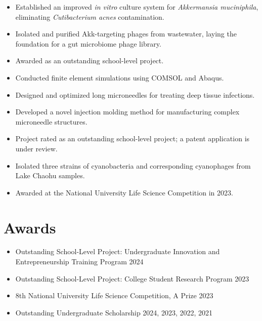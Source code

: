 \documentclass{resume}
\begin{document}
\begin{itemize}
  \item Established an improved \textit{in vitro} culture system for \textit{Akkermansia muciniphila}, eliminating \textit{Cutibacterium acnes} contamination.
  \item Isolated and purified Akk-targeting phages from wastewater, laying the foundation for a gut microbiome phage library.
  \item Awarded as an outstanding school-level project.
\end{itemize}

\begin{itemize}
  \item Conducted finite element simulations using COMSOL and Abaqus.
  \item Designed and optimized long microneedles for treating deep tissue infections.
  \item Developed a novel injection molding method for manufacturing complex microneedle structures.
  \item Project rated as an outstanding school-level project; a patent application is under review.
\end{itemize}

\begin{itemize}
  \item Isolated three strains of cyanobacteria and corresponding cyanophages from Lake Chaohu samples.
  \item Awarded at the National University Life Science Competition in 2023.
\end{itemize}

\section{Awards}
\begin{itemize}
  \item Outstanding School-Level Project: Undergraduate Innovation and Entrepreneurship Training Program \hfill 2024
  \item Outstanding School-Level Project: College Student Research Program \hfill 2023
  \item 8th National University Life Science Competition, A Prize \hfill 2023
  \item Outstanding Undergraduate Scholarship \hfill 2024, 2023, 2022, 2021
\end{itemize}
\end{document}
